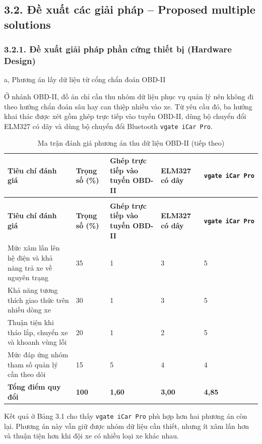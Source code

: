 \documentclass[a4paper]{extarticle}
\newcommand{\thesissettableid}[2]{%
  \renewcommand{\thetable}{#1}%
  \renewcommand{\theHtable}{#2}%
}
\begin{document}
\subsection{3.2. Đề xuất các giải pháp -- Proposed multiple solutions}\label{ux111ux1ec1-xuux1ea5t-cuxe1c-giux1ea3i-phuxe1p-proposed-multiple-solutions}

\subsubsection{3.2.1. Đề xuất giải pháp phần cứng thiết bị (Hardware Design)}\label{ux111ux1ec1-xuux1ea5t-giux1ea3i-phuxe1p-phux1ea7n-cux1ee9ng-thiux1ebft-bux1ecb-hardware-design}

a, Phương án lấy dữ liệu từ cổng chẩn đoán OBD-II

Ở nhánh OBD-II, đồ án chỉ cần thu nhóm dữ liệu phục vụ quản lý nên không đi theo hướng chẩn đoán sâu hay can thiệp nhiều vào xe. Từ yêu cầu đó, ba hướng khai thác được xét gồm ghép trực tiếp vào tuyến OBD-II, dùng bộ chuyển đổi ELM327 có dây và dùng bộ chuyển đổi Bluetooth \texttt{vgate\ iCar\ Pro}.

{\thesissettableid{3.1}{condensed-r2-bang-3-1-ma-tran-danh-gia-phuong-an-thu-du-lieu-obd-ii}
\def\LTcaptype{table}
\begin{longtable}{|L{(\linewidth - 8\tabcolsep) * }|L{(\linewidth - 8\tabcolsep) * }|L{(\linewidth - 8\tabcolsep) * }|L{(\linewidth - 8\tabcolsep) * }|L{(\linewidth - 8\tabcolsep) * }|}
\caption{Ma trận đánh giá phương án thu dữ liệu OBD-II}\label{tab:condensed-r2-bang-3-1-ma-tran-danh-gia-phuong-an-thu-du-lieu-obd-ii}\\
\hline
\textbf{Tiêu chí đánh giá} & \textbf{Trọng số (\%)} & \textbf{Ghép trực tiếp vào tuyến OBD-II} & \textbf{ELM327 có dây} & \textbf{\texttt{vgate\ iCar\ Pro}} \\
\hline
\endfirsthead
\caption[]{Ma trận đánh giá phương án thu dữ liệu OBD-II (tiếp theo)}\\
\hline
\textbf{Tiêu chí đánh giá} & \textbf{Trọng số (\%)} & \textbf{Ghép trực tiếp vào tuyến OBD-II} & \textbf{ELM327 có dây} & \textbf{\texttt{vgate\ iCar\ Pro}} \\
\hline
\endhead
\endfoot
\endlastfoot
Mức xâm lấn lên hệ điện và khả năng trả xe về nguyên trạng & 35 & 1 & 3 & 5 \\\hline
Khả năng tương thích giao thức trên nhiều dòng xe & 30 & 1 & 3 & 5 \\\hline
Thuận tiện khi tháo lắp, chuyển xe và khoanh vùng lỗi & 20 & 1 & 2 & 5 \\\hline
Mức đáp ứng nhóm tham số quản lý cần theo dõi & 15 & 5 & 4 & 4 \\\hline
\textbf{Tổng điểm quy đổi} & \textbf{100} & \textbf{1,60} & \textbf{3,00} & \textbf{4,85} \\\hline
\end{longtable}
}
Kết quả ở Bảng 3.1 cho thấy \texttt{vgate\ iCar\ Pro} phù hợp hơn hai phương án còn lại. Phương án này vẫn giữ được nhóm dữ liệu cần thiết, nhưng ít xâm lấn hơn và thuận tiện hơn khi đội xe có nhiều loại xe khác nhau.
\end{document}
